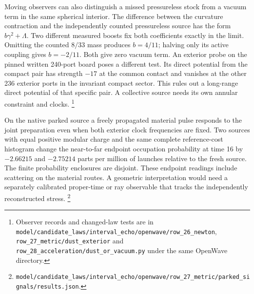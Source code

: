 \documentclass[11pt]{article}
\begin{document}
Moving observers can also distinguish a missed pressureless stock from
a vacuum term in the same spherical interior. The difference between
the curvature contraction and the independently counted pressureless
source has the form $b\gamma^2+\Lambda$. Two different measured
boosts fix both coefficients exactly in the limit. Omitting the counted
$8/33$ mass produces $b=4/11$; halving only its active coupling gives
$b=-2/11$. Both give zero vacuum term. An exterior probe on the pinned
written 240-port board poses a different test. Its direct potential
from the compact pair has strength $-17$ at the common contact and
vanishes at the other 236 exterior ports in the invariant compact
sector. This rules out a long-range direct potential of that specific
pair. A collective source needs its own annular constraint and clocks.%
\footnote{Observer records and changed-law tests are in
\nolinkurl{model/candidate_laws/interval_echo/openwave/row_26_newton},
\nolinkurl{row_27_metric/dust_exterior} and \nolinkurl{row_28_acceleration/dust_or_vacuum.py}
under the same OpenWave directory.}

On the native parked source a freely propagated material pulse responds
to the joint preparation even when both exterior clock frequencies are
fixed. Two sources with equal positive modular charge and the same
complete reference-cost histogram change the near-to-far endpoint
occupation probability at time 16 by $-2.66215$ and $-2.75214$ parts
per million of launches relative to the fresh source. The finite
probability enclosures are disjoint. These endpoint readings include
scattering on the material routes. A geometric interpretation would
need a separately calibrated proper-time or ray observable that tracks
the independently reconstructed stress.%
\footnote{\nolinkurl{model/candidate_laws/interval_echo/openwave/row_27_metric/parked_signals/results.json}.}
\end{document}

